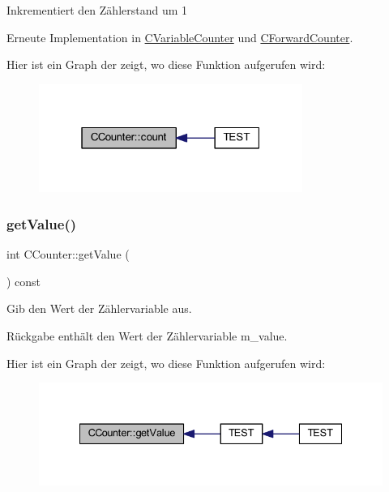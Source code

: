 Inkrementiert den Zählerstand um 1 

Erneute Implementation in \hyperlink{class_c_variable_counter_a693c27202acd18d53c4642ce642927bc}{C\+Variable\+Counter} und \hyperlink{class_c_forward_counter_afc451afa9f8b76f70b28c08982265a86}{C\+Forward\+Counter}.

Hier ist ein Graph der zeigt, wo diese Funktion aufgerufen wird\+:
\nopagebreak
\begin{figure}[H]
\begin{center}
\leavevmode
\includegraphics[width=244pt]{class_c_counter_a90f3e164f3fc1dcf91044702d6940c4d_icgraph}
\end{center}
\end{figure}
\mbox{\label{class_c_counter_ad91db4cd517159f7cbb7d3976eede482}} 
\subsubsection{\texorpdfstring{get\+Value()}{getValue()}}
{\footnotesize\ttfamily int C\+Counter\+::get\+Value (\begin{DoxyParamCaption}{ }\end{DoxyParamCaption}) const}

Gib den Wert der Zählervariable aus. \begin{DoxyReturn}{Rückgabe}
enthält den Wert der Zählervariable m\+\_\+value. 
\end{DoxyReturn}
Hier ist ein Graph der zeigt, wo diese Funktion aufgerufen wird\+:
\nopagebreak
\begin{figure}[H]
\begin{center}
\leavevmode
\includegraphics[width=335pt]{class_c_counter_ad91db4cd517159f7cbb7d3976eede482_icgraph}
\end{center}
\end{figure}
\mbox{\label{class_c_counter_ac43e4c4cb447d22636ac208d426d95eb}} 
